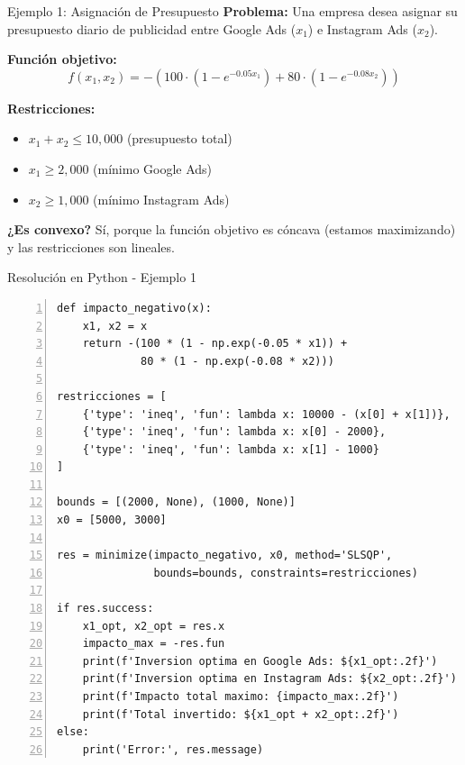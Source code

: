 \documentclass{beamer}
\begin{document}
\begin{frame}{Ejemplo 1: Asignación de Presupuesto}
    \textbf{Problema:} Una empresa desea asignar su presupuesto diario de publicidad entre Google Ads ($x_1$) e Instagram Ads ($x_2$).
    
    \vspace{0.3cm}
    
    \textbf{Función objetivo:}
    \[f(x_1, x_2) = - \left( 100 \cdot \left(1 - e^{-0.05 x_1}\right) + 80 \cdot \left(1 - e^{-0.08 x_2}\right) \right)\]
    
    \textbf{Restricciones:}
    \begin{itemize}
        \item $x_1 + x_2 \leq 10,000$ (presupuesto total)
        \item $x_1 \geq 2,000$ (mínimo Google Ads)
        \item $x_2 \geq 1,000$ (mínimo Instagram Ads)
    \end{itemize}
    
    \vspace{0.3cm}
    
    \textbf{¿Es convexo?} Sí, porque la función objetivo es cóncava (estamos maximizando) y las restricciones son lineales.
\end{frame}

\begin{frame}[fragile]{Resolución en Python - Ejemplo 1}
    \begin{lstlisting}[numbers=left, numbersep=5pt]
def impacto_negativo(x):
    x1, x2 = x
    return -(100 * (1 - np.exp(-0.05 * x1)) + 
             80 * (1 - np.exp(-0.08 * x2)))

restricciones = [
    {'type': 'ineq', 'fun': lambda x: 10000 - (x[0] + x[1])},
    {'type': 'ineq', 'fun': lambda x: x[0] - 2000},
    {'type': 'ineq', 'fun': lambda x: x[1] - 1000}
]

bounds = [(2000, None), (1000, None)]
x0 = [5000, 3000]

res = minimize(impacto_negativo, x0, method='SLSQP', 
               bounds=bounds, constraints=restricciones)

if res.success:
    x1_opt, x2_opt = res.x
    impacto_max = -res.fun
    print(f'Inversion optima en Google Ads: ${x1_opt:.2f}')
    print(f'Inversion optima en Instagram Ads: ${x2_opt:.2f}')
    print(f'Impacto total maximo: {impacto_max:.2f}')
    print(f'Total invertido: ${x1_opt + x2_opt:.2f}')
else:
    print('Error:', res.message)
    \end{lstlisting}
\end{frame}
\end{document}
